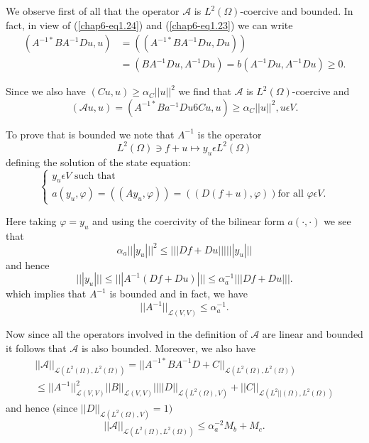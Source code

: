 We observe first of all that the operator $\mathscr{A}$ is $L^{2}
(\Omega)$-coercive and bounded. In fact, in view of
(\ref{chap6-eq1.24}) and (\ref{chap6-eq1.23}) we can write 
\begin{align*}
(A^{-1*} BA^{-1} Du, u) &= ((A^{-1*} BA^{-1} Du, Du))\\ 
&= (BA^{-1} Du, A^{-1} Du) = b(A^{-1} Du, A^{-1} Du) \geq 0. 
\end{align*}

Since we also have $(Cu, u) \geq \alpha_{C} ||u||^{2}$
we find that $\mathscr{A}$ is $L^{2} (\Omega)$-coercive and
\begin{equation*}
(\mathscr{A}u, u) = (A^{-1*} Ba^{-1} Du 6 Cu, u) \geq \alpha_{C}
  ||u||^{2}, u \epsilon V.\tag{1.35}\label{chap6-eq1.35} 
\end{equation*}

To prove that is bounded we note that $A^{-1}$ is the operator
$$
L^{2} (\Omega) \ni f + u \mapsto y_{u} \epsilon L^{2}(\Omega)
$$
defining the solution of the state equation:
\begin{equation*}
\begin{cases}
y_{u} \epsilon V \text{ such that }\\
a(y_{u}, \varphi) = ((Ay_{u}, \varphi)) = ((D(f+u),\varphi)) \text{
  for all } \varphi \epsilon V. 
\end{cases}
\end{equation*}

Here taking $\varphi = y_{u}$ and using the coercivity of the bilinear
form $a(\cdot , \cdot)$ we see that 
$$
\alpha_{a} |||y_{u}|||^{2} \leq |||Df + Du||| |||y_{u}|||
$$
and hence
$$
|||y_{u}||| \leq |||A^{-1} (Df + Du)||| \leq \alpha_{a}^{-1} |||Df + Du|||.
$$
which implies that $A^{-1}$ is bounded and in fact, we have
\begin{equation*}
||A^{-1}||_{\mathscr{L}(V, V)} \leq \alpha_{a}^{-1}.\tag{1.36}\label{chap6-eq1.36}
\end{equation*}

Now since all the operators involved in the definition of
$\mathscr{A}$ are linear and bounded it follows that $\mathscr{A}$ is
also bounded. Moreover, we also have 
\begin{align*}
|| \mathscr{A} ||_{\mathscr{L}(L^{2}  (\Omega), L^{2} (\Omega))} =
||A^{-1*} BA^{-1} D + C ||_{\mathscr{L}(L^{2} (\Omega), L^{2}
  (\Omega))}\\ 
\leq ||A^{-1}||^{2}_{\mathscr{L}(V, V)} ||B||_{\mathscr{L}(V, V)}
||||D||_{\mathscr{L}(L^{2} (\Omega), V)} + ||C||_{\mathscr{L}(L^{2}
||(\Omega), L^{2} (\Omega))} 
\end{align*}
and hence (since $||D||_{\mathscr{L}(L^{2} (\Omega), V)} = 1)$
\begin{equation*}
||\mathscr{A}||_{\mathscr{L} (L^{2} (\Omega), L^{2} (\Omega))} \leq
  \alpha_{a}^{-2} M_{b} + M_{c}.\tag{1.37}\label{chap6-eq1.37}  
\end{equation*}

